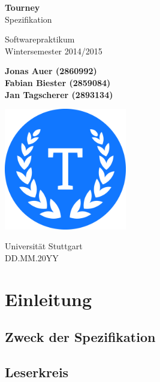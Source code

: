\documentclass[11pt]{article}
\begin{document}
\begin{titlepage}
	\begin{center}
		\vspace*{1cm}

		\Huge
		\textbf{Tourney}\\
		Spezifikation

		\vspace{0.5cm}
		\LARGE
		Softwarepraktikum\\
		\Large
		Wintersemester 2014/2015

		\vspace{1.5cm}

		\large
		\textbf{Jonas Auer (2860992)\\
				 Fabian Biester (2859084)\\
				 Jan Tagscherer (2893134)}

		\vfill

		\includegraphics[width=0.4\textwidth]{Logo.png}

		\vspace{1.5cm}

		\Large
		Universität Stuttgart\\
		DD.MM.20YY
	\end{center}
\end{titlepage}

\newpage

\tableofcontents
\newpage

\section{Einleitung}

\subsection{Zweck der Spezifikation}

\subsection{Leserkreis}
\end{document}

